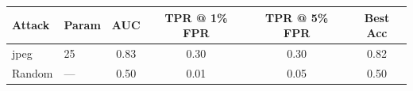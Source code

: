 \begin{tabular}{llcccc}
\toprule
Attack & Param & AUC & TPR @ 1\% FPR & TPR @ 5\% FPR & Best Acc \\
\midrule
jpeg & 25 & 0.83 & 0.30 & 0.30 & 0.82 \\
Random & — & 0.50 & 0.01 & 0.05 & 0.50 \\
\bottomrule
\end{tabular}
